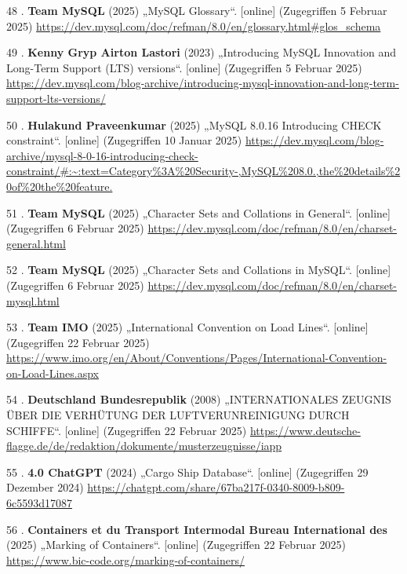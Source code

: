 \documentclass[
    headings=optiontotocandhead,%
    twoside,
    numbers=noenddot,%
    12pt, %
    titlepage, %
    parskip=full, %
    listof=leveldown, 
    numbers=noenddot, %
    a4paper,DIV=14,
    BCOR=15mm,
]{scrbook}
\newlength{\cslhangindent}
\newenvironment{cslreferences}%
  {\setlength{\parindent}{0pt}%
  \everypar{\setlength{\hangindent}{\cslhangindent}}\ignorespaces}%
  {\par}
\begin{document}
\begin{cslreferences}
\leavevmode\hypertarget{ref-mysql-glosar}{}%
48 . \textbf{Team MySQL} (2025) „MySQL Glossary``. {[}online{]}
(Zugegriffen 5 Februar 2025)
\url{https://dev.mysql.com/doc/refman/8.0/en/glossary.html\#glos_schema}

\leavevmode\hypertarget{ref-mysql-lts}{}%
49 . \textbf{Kenny Gryp Airton Lastori} (2023) „Introducing MySQL
Innovation and Long-Term Support (LTS) versions``. {[}online{]}
(Zugegriffen 5 Februar 2025)
\url{https://dev.mysql.com/blog-archive/introducing-mysql-innovation-and-long-term-support-lts-versions/}

\leavevmode\hypertarget{ref-mysql-8.0.16}{}%
50 . \textbf{Hulakund Praveenkumar} (2025) „MySQL 8.0.16 Introducing
CHECK constraint``. {[}online{]} (Zugegriffen 10 Januar 2025)
\url{https://dev.mysql.com/blog-archive/mysql-8-0-16-introducing-check-constraint/\#:~:text=Category\%3A\%20Security-,MySQL\%208.0.,the\%20details\%20of\%20the\%20feature.}

\leavevmode\hypertarget{ref-DB-character-set}{}%
51 . \textbf{Team MySQL} (2025) „Character Sets and Collations in
General``. {[}online{]} (Zugegriffen 6 Februar 2025)
\url{https://dev.mysql.com/doc/refman/8.0/en/charset-general.html}

\leavevmode\hypertarget{ref-mysql-character-set}{}%
52 . \textbf{Team MySQL} (2025) „Character Sets and Collations in
MySQL``. {[}online{]} (Zugegriffen 6 Februar 2025)
\url{https://dev.mysql.com/doc/refman/8.0/en/charset-mysql.html}

\leavevmode\hypertarget{ref-imo}{}%
53 . \textbf{Team IMO} (2025) „International Convention on Load Lines``.
{[}online{]} (Zugegriffen 22 Februar 2025)
\url{https://www.imo.org/en/About/Conventions/Pages/International-Convention-on-Load-Lines.aspx}

\leavevmode\hypertarget{ref-iapp}{}%
54 . \textbf{Deutschland Bundesrepublik} (2008) „INTERNATIONALES ZEUGNIS
ÜBER DIE VERHÜTUNG DER LUFTVERUNREINIGUNG DURCH SCHIFFE``. {[}online{]}
(Zugegriffen 22 Februar 2025)
\url{https://www.deutsche-flagge.de/de/redaktion/dokumente/musterzeugnisse/iapp}

\leavevmode\hypertarget{ref-gpt-schiff-db}{}%
55 . \textbf{4.0 ChatGPT} (2024) „Cargo Ship Database``. {[}online{]}
(Zugegriffen 29 Dezember 2024)
\url{https://chatgpt.com/share/67ba217f-0340-8009-b809-6c5593d17087}

\leavevmode\hypertarget{ref-bic-code}{}%
56 . \textbf{Containers et du Transport Intermodal Bureau International
des} (2025) „Marking of Containers``. {[}online{]} (Zugegriffen 22
Februar 2025) \url{https://www.bic-code.org/marking-of-containers/}


\end{cslreferences}
\end{document}
